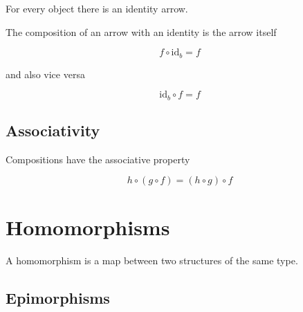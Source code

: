 \documentclass{article}
\begin{document}
For every object there is an identity arrow.

\begin{center}
\end{center}

The composition of an arrow with an identity is the arrow itself

\begin{center}
\end{center}

\[
    f \circ \text{id}_b = f
\]

and also vice versa

\[
    \text{id}_b \circ f = f
\]

\subsection{Associativity}

Compositions have the associative property

\begin{center}
\end{center}

\[
    h \circ (g \circ f) = (h \circ g) \circ f
\]

\pagebreak

\section{Homomorphisms}

A homomorphism is a map between two structures of the same type.

\subsection{Epimorphisms}
\end{document}
